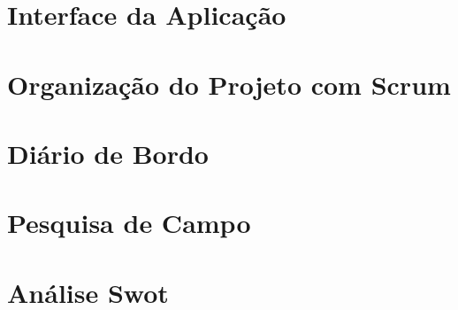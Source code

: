 \documentclass[
    a4paper,
    12pt,
    english,
    brazilian
]{article}
\begin{document}
\section{Interface da Aplicação}
\medskip
    \label{sect:Interface-Aplicacao}
    
    

\section{Organização do Projeto com Scrum}
\medskip
    \label{sect:Scrum}
    

\section{Diário de Bordo}
\medskip
    \label{sect:Diario-de-Bordo}
    

\section{Pesquisa de Campo}
\medskip
    \label{sect:Pesquisa-de-Campo}
    

\section{Análise Swot}
\medskip
    \label{sect:Analise-Swot}
    

\clearpage
\end{document}
